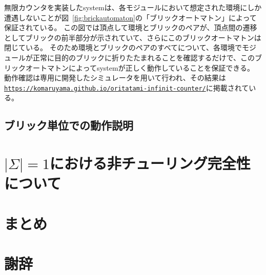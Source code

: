 \documentclass[a4j,11pt]{article}
\begin{document}
無限カウンタを実装したsystemは、各モジュールにおいて想定された環境にしか遭遇しないことが図~\ref{fig:brickautomaton}の「ブリックオートマトン」によって保証されている。
この図では頂点して環境とブリックのペアが、頂点間の遷移としてブリックの前半部分が示されていて、さらにこのブリックオートマトンは閉じている。
そのため環境とブリックのペアのすべてについて、各環境でモジュールが正常に目的のブリックに折りたたまれることを確認するだけで、このブリックオートマトンによってsystemが正しく動作していることを保証できる。
動作確認は専用に開発したシミュレータを用いて行われ、その結果は\href{https://komaruyama.github.io/oritatami-infinit-counter/}{\texttt{https://komaruyama.github.io/oritatami-infinit-counter/}}に掲載されている。


\subsection{ブリック単位での動作説明}


\section{$| \Sigma | = 1$における非チューリング完全性について}

\section{まとめ}

\section{謝辞}



\end{document}
